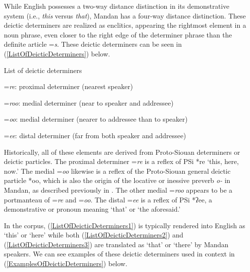 While English possesses a two-way distance distinction in its demonstrative system (i.e., \textit{this} versus \textit{that}), Mandan has a four-way distance distinction. These deictic determiners are realized as enclitics, appearing the rightmost element in a noun phrase, even closer to the right edge of the determiner phrase than the definite article =\textit{s}. These deictic determiners can be seen in (\ref{ListOfDeicticDeterminers}) below.

\begin{exe}

\item\label{ListOfDeicticDeterminers} List of deictic determiners

\begin{xlist}

\item\label{ListOfDeicticDeterminers1} =\textit{re}: proximal determiner (nearest speaker)

\item\label{ListOfDeicticDeterminers2} =\textit{roo}: medial determiner (near to speaker and addressee)

\item\label{ListOfDeicticDeterminers3} =\textit{oo}: medial determiner (nearer to addressee than to speaker)

\item\label{ListOfDeicticDeterminers4} =\textit{ee}: distal determiner (far from both speaker and addressee)

\end{xlist}

\end{exe}

Historically, all of these elements are derived from Proto-Siouan determiners or deictic particles. The proximal determiner =\textit{re} is a reflex of PSi *re `this, here, now.' The medial =\textit{oo} likewise is a reflex of the Proto-Siouan general deictic particle *oo, which is also the origin of the locative or inessive preverb \textit{o-} in Mandan, as described previously in . The other medial =\textit{roo} appears to be a portmanteau of =\textit{re} and =\textit{oo}. The distal =\textit{ee} is a reflex of PSi *ʔee, a demonstrative or pronoun meaning `that' or `the aforesaid.'

In the corpus, (\ref{ListOfDeicticDeterminers1}) is typically rendered into English as `this' or `here' while both (\ref{ListOfDeicticDeterminers2}) and (\ref{ListOfDeicticDeterminers3}) are translated as `that' or `there' by Mandan speakers. We can see examples of these deictic determiners used in context in (\ref{ExamplesOfDeicticDeterminers}) below.

